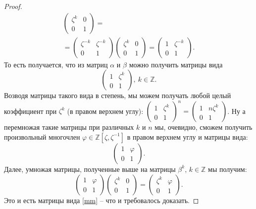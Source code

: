 \documentclass{article}
\begin{document}
\begin{proof}
\begin{multline*}
\begin{pmatrix}
            \zeta^k & 0 \\
            0 & 1
        \end{pmatrix} = \\
        =\begin{pmatrix}
            \zeta^{-k} & \zeta^{-k} \\
            0 & 1
        \end{pmatrix}
        \begin{pmatrix}
            \zeta^k & 0 \\
            0 & 1
        \end{pmatrix} = 
        \begin{pmatrix}
            1 & \zeta^{-k} \\
            0 & 1
        \end{pmatrix}.
    \end{multline*}
    То есть получается, что из матриц $\alpha$ и $\beta$ можно получить матрицы вида
    \[
        \begin{pmatrix}
            1 & \zeta^{k} \\
            0 & 1
        \end{pmatrix}, \ k \in \mathbb{Z}.
    \]
    Возводя матрицы такого вида в степень, мы можем получать любой целый коэффициент при $\zeta^k$ (в правом верхнем углу):
    $
        \begin{pmatrix}
            1 & \zeta^{k} \\
            0 & 1
        \end{pmatrix}^n
        =
        \begin{pmatrix}
            1 & n\zeta^{k} \\
            0 & 1
        \end{pmatrix}
    $. Ну а перемножая такие матрицы при различных $k$ и $n$ мы, очевидно, сможем получить произвольный многочлен $\varphi \in \mathbb{Z}[\zeta, \zeta^{-1}]$ в правом верхнем углу и матрицы вида:
    \[
        \begin{pmatrix}
            1 & \varphi \\
            0 & 1
        \end{pmatrix}.
    \]
     Далее, умножая матрицы, полученные выше на матрицы $\beta^k$, $k \in \mathbb{Z}$ мы получим:
     \[
        \begin{pmatrix}
            1 & \varphi \\
            0 & 1
        \end{pmatrix}
        \begin{pmatrix}
            \zeta^k & 0 \\
            0 & 1
        \end{pmatrix} =
        \begin{pmatrix}
            \zeta^k & \varphi \\
            0 & 1
        \end{pmatrix}.
     \]
     Это и есть матрицы вида \eqref{mm} -- что и требовалось доказать.


\end{proof}
\end{document}
